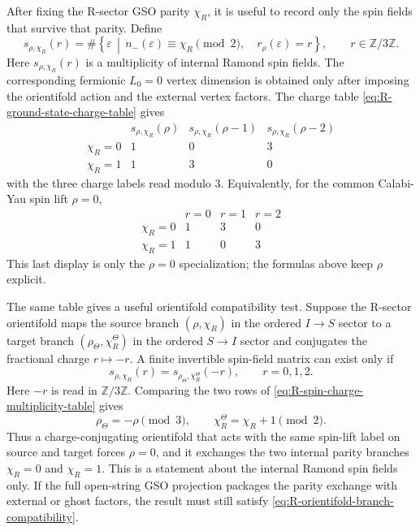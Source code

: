 \documentclass[11pt]{article}
\newcommand{\Z}{\mathbb{Z}}
\begin{document}
After fixing the R-sector GSO parity \(\chi_R\), it is useful to record only the spin fields
that survive that parity. Define
\begin{equation}
  s_{\rho,\chi_R}(r)
  =
  \#\left\{
    \varepsilon\,\middle|\,
    n_-(\varepsilon)\equiv\chi_R\!\!\pmod2,\quad
    r_\rho(\varepsilon)=r
  \right\},
  \qquad r\in\Z/3\Z .
  \label{eq:R-spin-charge-multiplicity-definition}
\end{equation}
Here \(s_{\rho,\chi_R}(r)\) is a multiplicity of internal Ramond spin fields. The corresponding
fermionic \(L_0=0\) vertex dimension is obtained only after imposing the orientifold action and
the external vertex factors. The charge table
\eqref{eq:R-ground-state-charge-table} gives
\begin{equation}
  \begin{array}{c|ccc}
  & s_{\rho,\chi_R}(\rho) & s_{\rho,\chi_R}(\rho-1) & s_{\rho,\chi_R}(\rho-2) \\
  \hline
  \chi_R=0 & 1 & 0 & 3 \\
  \chi_R=1 & 1 & 3 & 0
  \end{array}
  \label{eq:R-spin-charge-multiplicity-table}
\end{equation}
with the three charge labels read modulo \(3\). Equivalently, for the common Calabi-Yau spin lift
\(\rho=0\),
\begin{equation}
  \begin{array}{c|ccc}
  & r=0 & r=1 & r=2 \\
  \hline
  \chi_R=0 & 1 & 3 & 0 \\
  \chi_R=1 & 1 & 0 & 3
  \end{array}
  \label{eq:R-spin-charge-multiplicity-rho-zero}
\end{equation}
This last display is only the \(\rho=0\) specialization; the formulas above keep \(\rho\)
explicit.

The same table gives a useful orientifold compatibility test. Suppose the R-sector orientifold
maps the source branch \((\rho,\chi_R)\) in the ordered \(I\to S\) sector to a target branch
\((\rho_\Theta,\chi_R^\Theta)\) in the ordered \(S\to I\) sector and conjugates the fractional
charge \(r\mapsto-r\). A finite invertible spin-field matrix can exist only if
\begin{equation}
  s_{\rho,\chi_R}(r)
  =
  s_{\rho_\Theta,\chi_R^\Theta}(-r),
  \qquad
  r=0,1,2.
  \label{eq:R-orientifold-branch-compatibility}
\end{equation}
Here \(-r\) is read in \(\Z/3\Z\). Comparing the two rows of
\eqref{eq:R-spin-charge-multiplicity-table} gives
\begin{equation}
  \rho_\Theta=-\rho\pmod3,
  \qquad
  \chi_R^\Theta=\chi_R+1\pmod2.
  \label{eq:R-orientifold-branch-map}
\end{equation}
Thus a charge-conjugating orientifold that acts with the same spin-lift label on source and target
forces \(\rho=0\), and it exchanges the two internal parity branches \(\chi_R=0\) and
\(\chi_R=1\). This is a statement about the internal Ramond spin fields only. If the full
open-string GSO projection packages the parity exchange with external or ghost factors, the
result must still satisfy \eqref{eq:R-orientifold-branch-compatibility}.
\end{document}
